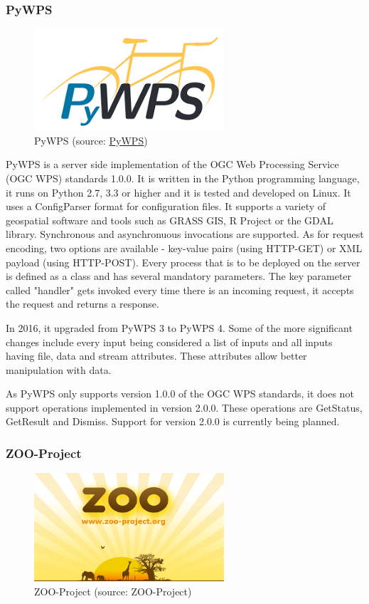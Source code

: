 \subsubsection{PyWPS}
\begin{figure}[H] \centering
      \includegraphics[width=200pt]{./pictures/pywps.png}
      \caption[PyWPS logo]{PyWPS (source:
\href{http://pywps.org/images/pywps.png}{PyWPS})}
      \label{fig:PyWPS}
  \end{figure}

PyWPS is a server side implementation of the OGC Web Processing Service (OGC WPS) standards 1.0.0. It is written in the Python programming language, it runs on Python 2.7, 3.3 or higher and it is tested and developed on Linux. It uses a ConfigParser format for configuration files. It supports a variety of geospatial software and tools such as GRASS GIS, R Project or the GDAL library. Synchronous and asynchronuous invocations are supported. As for request encoding, two options are available - key-value pairs (using HTTP-GET) or XML payload (using HTTP-POST). Every process that is to be deployed on the server is defined as a class and has several mandatory parameters. The key parameter called "handler" gets invoked every time there is an incoming request, it accepts the request and returns a response. 

In 2016, it upgraded from PyWPS 3 to PyWPS 4. Some of the more significant changes include every input being considered a list of inputs and all inputs having file, data and stream attributes. These attributes allow better manipulation with data. 
	
As PyWPS only supports  version 1.0.0 of the OGC WPS standards, it does not support operations implemented in version 2.0.0. These operations are GetStatus, GetResult and Dismiss. Support for version 2.0.0 is currently being planned.\cite{pywps}
 

\subsubsection{ZOO-Project}
\begin{figure}[H] \centering
      \includegraphics[width=200pt]{./pictures/zoo.png}
      \caption[ZOO-Project logo]{ZOO-Project (source: ZOO-Project)}
      \label{fig:ZOO-Project}
  \end{figure}

